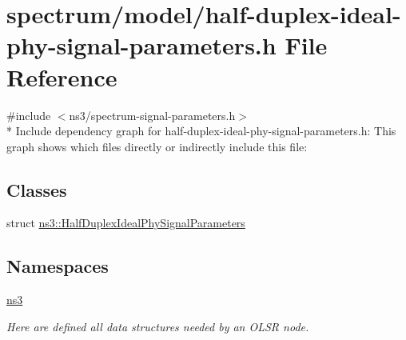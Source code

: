 \hypertarget{half-duplex-ideal-phy-signal-parameters_8h}{}\section{spectrum/model/half-\/duplex-\/ideal-\/phy-\/signal-\/parameters.h File Reference}
\label{half-duplex-ideal-phy-signal-parameters_8h}
{\ttfamily \#include $<$ns3/spectrum-\/signal-\/parameters.\+h$>$}\\*
Include dependency graph for half-\/duplex-\/ideal-\/phy-\/signal-\/parameters.h\+:
This graph shows which files directly or indirectly include this file\+:
\subsection*{Classes}
\begin{DoxyCompactItemize}
\item 
struct \hyperlink{structns3_1_1HalfDuplexIdealPhySignalParameters}{ns3\+::\+Half\+Duplex\+Ideal\+Phy\+Signal\+Parameters}
\end{DoxyCompactItemize}
\subsection*{Namespaces}
\begin{DoxyCompactItemize}
\item 
 \hyperlink{namespacens3}{ns3}
\begin{DoxyCompactList}\small\item\em Here are defined all data structures needed by an O\+L\+SR node. \end{DoxyCompactList}\end{DoxyCompactItemize}
